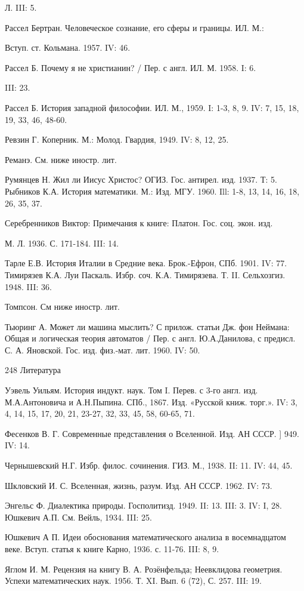 Л. III: 5.

Рассел Бертран. Человеческое сознание, его сферы и границы. ИЛ. М.:

Вступ. ст. Кольмана. 1957. IV: 46.

Рассел Б. Почему я не христианин? / Пер. с англ. ИЛ. М. 1958. I: 6.

III: 23.

Рассел Б. История западной философии. ИЛ. М., 1959. I: 1-3, 8, 9. IV:
7, 15, 18, 19, 33, 46, 48-60.

Ревзин Г. Коперник. М.: Молод. Гвардия, 1949. IV: 8, 12, 25.

Реманэ. См. ниже иностр. лит.

Румянцев Н. Жил ли Иисус Христос? ОГИЗ. Гос. антирел. изд. 1937. Т:
5. Рыбников К.А. История математики. М.: Изд. МГУ. 1960. Ill: 1-8, 13,
14, 16, 18, 26, 35, 37.

Серебренников Виктор: Примечания к книге: Платон. Гос. соц. экон.
изд.

М. Л. 1936. С. 171-184. III: 14.

Тарле Е.В. История Италии в Средние века. Брок.-Ефрон, СПб. 1901. IV:
77. Тимирязев К.А. Луи Паскаль. Избр. соч. К.А. Тимирязева. Т. II.
Сельхозгиз. 1948. III: 36.

Томпсон. См ниже иностр. лит.

Тьюринг А. Может ли машина мыслить? С прилож. статьи Дж. фон Неймана:
Общая и логическая теория автоматов / Пер. с англ. Ю.А.Данилова, с
предисл. С. А. Яновской. Гос. изд. физ.-мат. лит. 1960. IV: 50.

248 Литература

Уэвель Уильям. История индукт. наук. Том I. Перев. с 3-го англ. изд.
М.А.Антоновича и А.Н.Пыпина. СПб., 1867. Изд. «Русской книж. торг.».
IV: 3, 4, 14, 15, 17, 20, 21, 23-27, 32, 33, 45, 58, 60-65, 71.

Фесенков В. Г. Современные представления о Вселенной. Изд. АН СССР. ]
949. IV: 14.

Чернышевский Н.Г. Избр. филос. сочинения. ГИЗ. М., 1938. II: 11. IV:
44, 45.

Шкловский И. С. Вселенная, жизнь, разум. Изд. АН СССР. 1962.
IV: 73.

Энгельс Ф. Диалектика природы. Госполитизд. 1949. II: 13. III:
3. IV: I, 28. Юшкевич А.П. См. Вейль, 1934. III: 25.

Юшкевич А П. Идеи обоснования математического анализа в восемнадцатом
веке. Вступ. статья к книге Карно, 1936. с. 11-76. III: 8, 9.

Яглом И. М. Рецензия на книгу В. А. Розёнфельда; Неевклидова
геометрия. Успехи математических наук. 1956. Т. XI. Вып. 6 (72), С.
257. III: 19.

